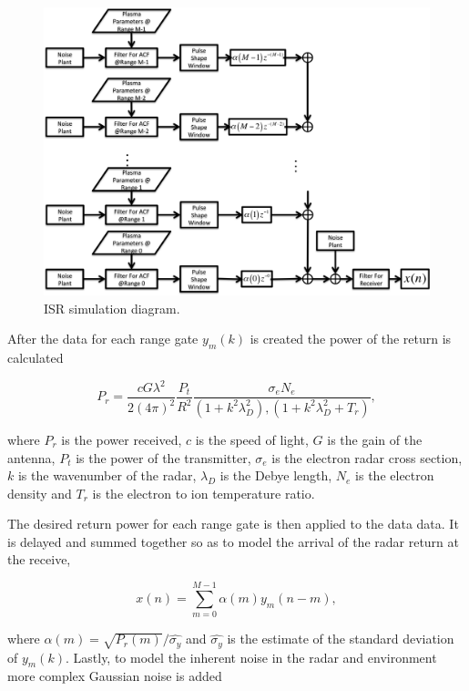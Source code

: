 \documentclass[draft,ras]{agutex}
\begin{document}
\begin{article}
\begin{figure}[!h]
\centering
\includegraphics[width=7.0in]{diagram}
\caption{ISR simulation diagram.}
\label{fig:isrdiag}
\end{figure}


After the data for each range gate $y_m(k)$ is created the power of the return is calculated

\begin{equation}
\label{eq3}
P_r = \frac{cG \lambda^2}{2(4\pi)^2}\frac{P_t }{R^2}\frac{\sigma_e N_e}{(1+k^2\lambda_D^2),(1+k^2\lambda_D^2 + T_r)},
\end{equation}
 
 \noindent where $P_r$ is the power received, $c$ is the speed of light, $G$ is the gain of the antenna, $P_t$ is the power of the transmitter, $\sigma_e$ is the electron radar cross section, $k$ is the wavenumber of the radar, $\lambda_D$ is the Debye length, $N_e$ is the electron density and $T_r$ is the electron to ion temperature ratio.
  
The desired return power for each range gate is then applied to the data data. It is delayed and summed together so as to model the arrival of the radar return at the receive,
 
\begin{equation}
\label{eq4}
x(n) = \displaystyle\sum\limits_{m =0}^{M-1} \alpha(m)y_m(n-m),
\end{equation}

\noindent where $\alpha(m) = \sqrt{P_r(m)}/\hat{\sigma_y}$ and $\hat{\sigma_y}$ is the estimate of the standard deviation of $y_m(k)$. Lastly, to model the inherent noise in the radar and environment more complex Gaussian noise is added


\end{article}
\end{document}
